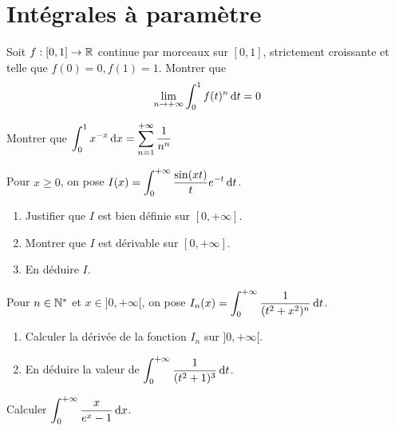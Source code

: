 \documentclass[12pt,a4paper]{exo_book}
\begin{document}
\chapter{Intégrales à paramètre}

\begin{exo}
    Soit $f : [0,1] \to \mathbb{R}$ continue par morceaux sur $[0,1]$, strictement croissante et telle que $f(0) = 0, f(1) = 1$. Montrer que
    \[\lim_{n\to+\infty} \int_0^1 f(t)^n {\rm \, d} t = 0\]
\end{exo}

\begin{exo}
    Montrer que $\displaystyle \int_0^1 x^{-x} {\rm \, d} x = \sum_{n=1}^{+\infty} \frac{1}{n^n}$
\end{exo}

\begin{exo}
    Pour $x \ge 0$, on pose $\displaystyle I(x) = \int_0^{+\infty} \frac{\sin(xt)}{t} e^{-t} {\rm \, d} t$.

    \begin{enumerate}
        \item Justifier que $I$ est bien définie sur $[0, +\infty]$.
        \item Montrer que $I$ est dérivable sur $[0, +\infty]$.
        \item En déduire $I$.
    \end{enumerate}
\end{exo}

\begin{exo}
    Pour $n \in \mathbb{N}^*$ et $x \in ]0,+\infty[$, on pose $\displaystyle I_n (x) = \int_0^{+\infty} \frac{1}{(t^2 + x^2)^n} {\rm \, d} t$.
    \begin{enumerate}
        \item Calculer la dérivée de la fonction $I_n$ sur $]0, +\infty[$.
        \item En déduire la valeur de $\displaystyle \int_0^{+\infty} \frac{1}{(t^2 + 1)^3} {\rm \, d} t$.
    \end{enumerate}
\end{exo}

\begin{exo}
    Calculer $\displaystyle \int_0^{+\infty} \frac{x}{e^x - 1} {\rm \, d} x$.
\end{exo}
\end{document}

